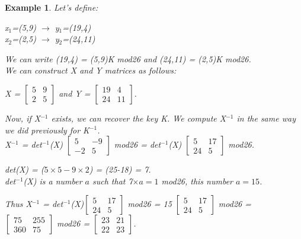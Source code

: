 \documentclass[a4paper, 12pt]{report}
\newtheorem{example}{\textbf{Example}}
\begin{document}
\begin{example}
	Let's define:
	\begin{center}
		x$_1$=(5,9) $\rightarrow$ y$_1$=(19,4)\\
		x$_2$=(2,5) $\rightarrow$ y$_2$=(24,11)
	\end{center}
	We can write (19,4) = (5,9)K mod26 and (24,11) = (2,5)K mod26.\\
	We can construct X and Y matrices as follows:
	\begin{center}
		X = $\begin{bmatrix}
		5 & 9\\
		2 & 5	
		\end{bmatrix}$ and Y = $
		\begin{bmatrix}
		19 & 4\\
		24 & 11	
		\end{bmatrix}$.
	\end{center}
	Now, if X$^{-1}$ exists, we can recover the key K. We compute X$^{-1}$ in the same way we did previously for K$^{-1}$.\\
	X$^{-1}$ = det$^{-1}$(X) $\begin{bmatrix}
		5 & -9\\
		-2 & 5	
	\end{bmatrix}$ mod26 = det$^{-1}$(X) $\begin{bmatrix}
	5 & 17\\
	24 & 5	
	\end{bmatrix}$ mod26.
	
	det(X) = ($5\times5-9\times2$) = (25-18) = 7.\\
	det$^{-1}$(X)  is a number $a$ such that 7$\times a = 1$ mod26, this number $a = 15$.
	
	Thus X$^{-1}$ = det$^{-1}$(X)$\begin{bmatrix}
		5 & 17\\
		24 & 5
	\end{bmatrix}$ mod26 = 15 $\begin{bmatrix}
		5 & 17\\
		24 & 5	
	\end{bmatrix}$ mod26 = $\begin{bmatrix}
	75 & 255\\
	360 & 75	
	\end{bmatrix}$ mod26 = $\begin{bmatrix}
		23 & 21\\
		22 & 23	
	\end{bmatrix}$.
	

\end{example}
\end{document}
